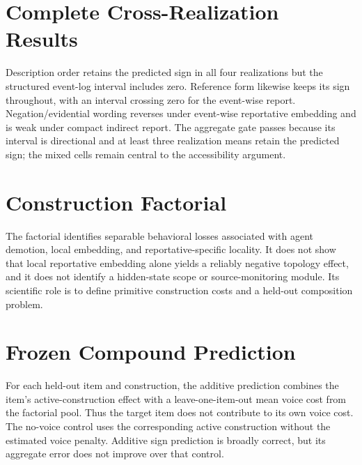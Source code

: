 \section{Complete Cross-Realization Results}



Description order retains the predicted sign in all four realizations but the
structured event-log interval includes zero. Reference form likewise keeps its
sign throughout, with an interval crossing zero for the event-wise report.
Negation/evidential wording reverses under event-wise reportative embedding and
is weak under compact indirect report. The aggregate gate passes because its
interval is directional and at least three realization means retain the
predicted sign; the mixed cells remain central to the accessibility argument.

\section{Construction Factorial}



The factorial identifies separable behavioral losses associated with agent
demotion, local embedding, and reportative-specific locality. It does not show
that local reportative embedding alone yields a reliably negative topology
effect, and it does not identify a hidden-state scope or source-monitoring
module. Its scientific role is to define primitive construction costs and a
held-out composition problem.

\section{Frozen Compound Prediction}


For each held-out item and construction, the additive prediction combines the
item's active-construction effect with a leave-one-item-out mean voice cost from
the factorial pool. Thus the target item does not contribute to its own voice
cost. The no-voice control uses the corresponding active construction without
the estimated voice penalty. Additive sign prediction is broadly correct, but
its aggregate error does not improve over that control.

